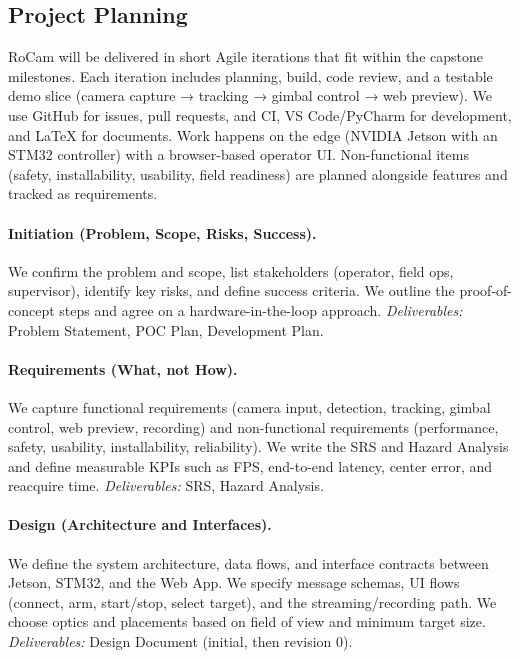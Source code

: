 \documentclass[12pt]{article}
\begin{document}
\subsection{Project Planning}

RoCam will be delivered in short Agile iterations that fit within the capstone milestones. Each iteration includes planning, build, code review, and a testable demo slice (camera capture → tracking → gimbal control → web preview). We use GitHub for issues, pull requests, and CI, VS Code/PyCharm for development, and LaTeX for documents. Work happens on the edge (NVIDIA Jetson with an STM32 controller) with a browser-based operator UI. Non-functional items (safety, installability, usability, field readiness) are planned alongside features and tracked as requirements.

\paragraph{Initiation (Problem, Scope, Risks, Success).}
We confirm the problem and scope, list stakeholders (operator, field ops, supervisor), identify key risks, and define success criteria. We outline the proof-of-concept steps and agree on a hardware-in-the-loop approach. \emph{Deliverables:} Problem Statement, POC Plan, Development Plan.

\paragraph{Requirements (What, not How).}
We capture functional requirements (camera input, detection, tracking, gimbal control, web preview, recording) and non-functional requirements (performance, safety, usability, installability, reliability). We write the SRS and Hazard Analysis and define measurable KPIs such as FPS, end-to-end latency, center error, and reacquire time. \emph{Deliverables:} SRS, Hazard Analysis.

\paragraph{Design (Architecture and Interfaces).}
We define the system architecture, data flows, and interface contracts between Jetson, STM32, and the Web App. We specify message schemas, UI flows (connect, arm, start/stop, select target), and the streaming/recording path. We choose optics and placements based on field of view and minimum target size. \emph{Deliverables:} Design Document (initial, then revision 0).
\end{document}
